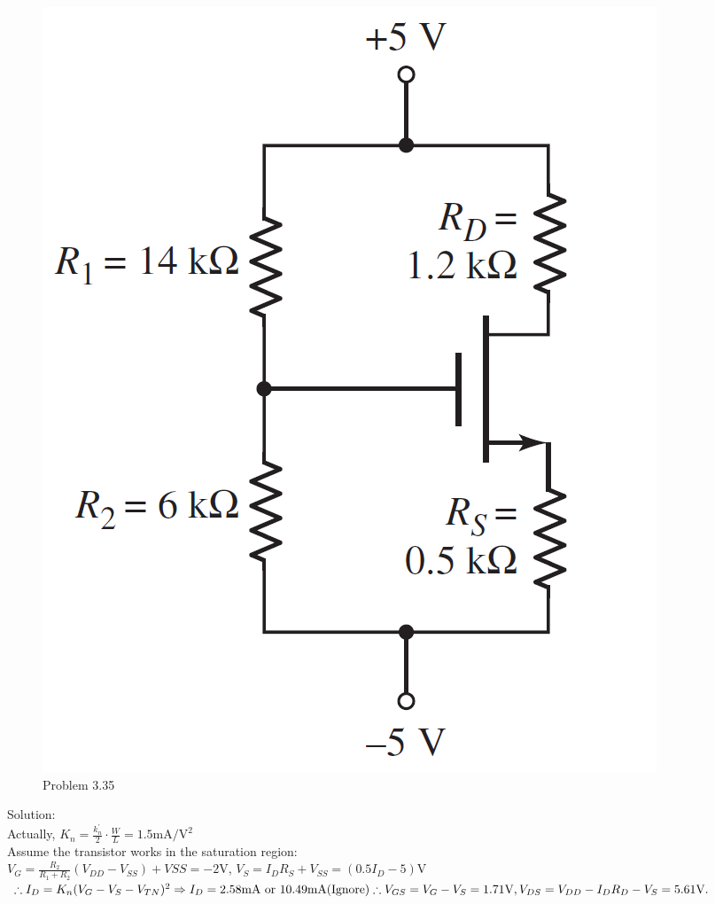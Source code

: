 \documentclass[a4paper,11pt,UTF8]{article}
\begin{document}
\begin{figure}[H] 
	\centering 
	\includegraphics[scale=0.2]{MD3.35.png}
	\caption{Problem 3.35}
\end{figure}
\noindent Solution:\\
Actually, $\displaystyle K_n = \frac{k^\prime_n}{2}\cdot\frac{W}{L}=1.5\text{mA}/\text{V}^2$\\
Assume the transistor works in the saturation region:\\
$\displaystyle V_G=\frac{R_2}{R_1+R_2}(V_{DD}-V_{SS})+VSS=-2$V, $V_S=I_DR_S+V_{SS}=(0.5I_D-5) \text{V}$\\
$\therefore I_{D}=K_n(V_{G}-V_S-V_{TN})^2\Rightarrow I_D=2.58\text{mA}\text{ or }10.49\text{mA}(\text{Ignore})\\
\therefore V_{GS}=V_G-V_S=1.71\text{V}, V_{DS}=V_{DD}-I_DR_D- V_S=5.61\text{V}.
$
\end{document}
